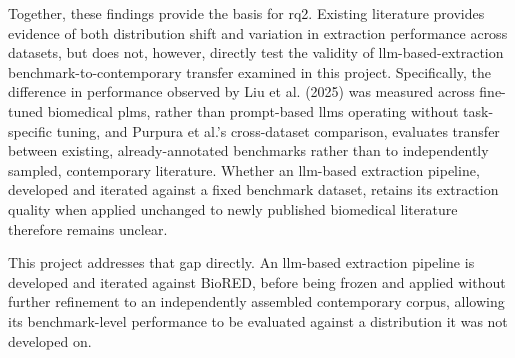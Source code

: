 Together, these findings provide the basis for \gls{rq2}. Existing literature provides evidence of both distribution shift and variation in extraction performance across datasets, but does not, however, directly test the validity of \gls{llm}-based-extraction benchmark-to-contemporary transfer examined in this project. Specifically, the difference in performance observed by Liu et al. (2025) was measured across fine-tuned biomedical \glspl{plm}, rather than prompt-based \glspl{llm} operating without task-specific tuning, and Purpura et al.'s cross-dataset comparison, evaluates transfer between existing, already-annotated benchmarks rather than to independently sampled, contemporary literature. Whether an \gls{llm}-based extraction pipeline, developed and iterated against a fixed benchmark dataset, retains its extraction quality when applied unchanged to newly published biomedical literature therefore remains unclear.

This project addresses that gap directly. An \gls{llm}-based extraction pipeline is developed and iterated against BioRED, before being frozen and applied without further refinement to an independently assembled contemporary corpus, allowing its benchmark-level performance to be evaluated against a distribution it was not developed on.